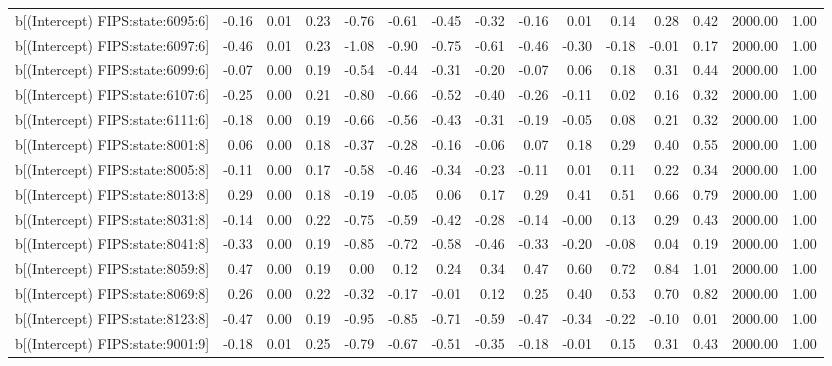 \begin{table}[ht]
\begin{tabular}{rrrrrrrrrrrrrrr}
  b[(Intercept) FIPS:state:6095:6] & -0.16 & 0.01 & 0.23 & -0.76 & -0.61 & -0.45 & -0.32 & -0.16 & 0.01 & 0.14 & 0.28 & 0.42 & 2000.00 & 1.00 \\ 
  b[(Intercept) FIPS:state:6097:6] & -0.46 & 0.01 & 0.23 & -1.08 & -0.90 & -0.75 & -0.61 & -0.46 & -0.30 & -0.18 & -0.01 & 0.17 & 2000.00 & 1.00 \\ 
  b[(Intercept) FIPS:state:6099:6] & -0.07 & 0.00 & 0.19 & -0.54 & -0.44 & -0.31 & -0.20 & -0.07 & 0.06 & 0.18 & 0.31 & 0.44 & 2000.00 & 1.00 \\ 
  b[(Intercept) FIPS:state:6107:6] & -0.25 & 0.00 & 0.21 & -0.80 & -0.66 & -0.52 & -0.40 & -0.26 & -0.11 & 0.02 & 0.16 & 0.32 & 2000.00 & 1.00 \\ 
  b[(Intercept) FIPS:state:6111:6] & -0.18 & 0.00 & 0.19 & -0.66 & -0.56 & -0.43 & -0.31 & -0.19 & -0.05 & 0.08 & 0.21 & 0.32 & 2000.00 & 1.00 \\ 
  b[(Intercept) FIPS:state:8001:8] & 0.06 & 0.00 & 0.18 & -0.37 & -0.28 & -0.16 & -0.06 & 0.07 & 0.18 & 0.29 & 0.40 & 0.55 & 2000.00 & 1.00 \\ 
  b[(Intercept) FIPS:state:8005:8] & -0.11 & 0.00 & 0.17 & -0.58 & -0.46 & -0.34 & -0.23 & -0.11 & 0.01 & 0.11 & 0.22 & 0.34 & 2000.00 & 1.00 \\ 
  b[(Intercept) FIPS:state:8013:8] & 0.29 & 0.00 & 0.18 & -0.19 & -0.05 & 0.06 & 0.17 & 0.29 & 0.41 & 0.51 & 0.66 & 0.79 & 2000.00 & 1.00 \\ 
  b[(Intercept) FIPS:state:8031:8] & -0.14 & 0.00 & 0.22 & -0.75 & -0.59 & -0.42 & -0.28 & -0.14 & -0.00 & 0.13 & 0.29 & 0.43 & 2000.00 & 1.00 \\ 
  b[(Intercept) FIPS:state:8041:8] & -0.33 & 0.00 & 0.19 & -0.85 & -0.72 & -0.58 & -0.46 & -0.33 & -0.20 & -0.08 & 0.04 & 0.19 & 2000.00 & 1.00 \\ 
  b[(Intercept) FIPS:state:8059:8] & 0.47 & 0.00 & 0.19 & 0.00 & 0.12 & 0.24 & 0.34 & 0.47 & 0.60 & 0.72 & 0.84 & 1.01 & 2000.00 & 1.00 \\ 
  b[(Intercept) FIPS:state:8069:8] & 0.26 & 0.00 & 0.22 & -0.32 & -0.17 & -0.01 & 0.12 & 0.25 & 0.40 & 0.53 & 0.70 & 0.82 & 2000.00 & 1.00 \\ 
  b[(Intercept) FIPS:state:8123:8] & -0.47 & 0.00 & 0.19 & -0.95 & -0.85 & -0.71 & -0.59 & -0.47 & -0.34 & -0.22 & -0.10 & 0.01 & 2000.00 & 1.00 \\ 
  b[(Intercept) FIPS:state:9001:9] & -0.18 & 0.01 & 0.25 & -0.79 & -0.67 & -0.51 & -0.35 & -0.18 & -0.01 & 0.15 & 0.31 & 0.43 & 2000.00 & 1.00 \\ 

\end{tabular}
\end{table}
